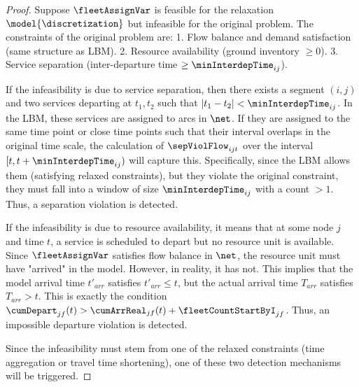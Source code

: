 \begin{proof}
Suppose $\fleetAssignVar$ is feasible for the relaxation $\model{\discretization}$ but infeasible for the original problem. The constraints of the original problem are:
1. Flow balance and demand satisfaction (same structure as LBM).
2. Resource availability (ground inventory $\ge 0$).
3. Service separation (inter-departure time $\ge \minInterdepTime_{ij}$).

If the infeasibility is due to service separation, then there exists a segment $(i,j)$ and two services departing at $t_1, t_2$ such that $|t_1 - t_2| < \minInterdepTime_{ij}$. In the LBM, these services are assigned to arcs in $\net$. If they are assigned to the same time point or close time points such that their interval overlaps in the original time scale, the calculation of $\sepViolFlow_{ijt}$ over the interval $[t, t+\minInterdepTime_{ij})$ will capture this. Specifically, since the LBM allows them (satisfying relaxed constraints), but they violate the original constraint, they must fall into a window of size $\minInterdepTime_{ij}$ with a count $> 1$. Thus, a separation violation is detected.

If the infeasibility is due to resource availability, it means that at some node $j$ and time $t$, a service is scheduled to depart but no resource unit is available. Since $\fleetAssignVar$ satisfies flow balance in $\net$, the resource unit must have "arrived" in the model. However, in reality, it has not. This implies that the model arrival time $t'_{arr}$ satisfies $t'_{arr} \le t$, but the actual arrival time $T_{arr}$ satisfies $T_{arr} > t$. This is exactly the condition $\cumDepart_{jf}(t) > \cumArrReal_{jf}(t) + \fleetCountStartByI_{jf}$. Thus, an impossible departure violation is detected.

Since the infeasibility must stem from one of the relaxed constraints (time aggregation or travel time shortening), one of these two detection mechanisms will be triggered.
\end{proof}